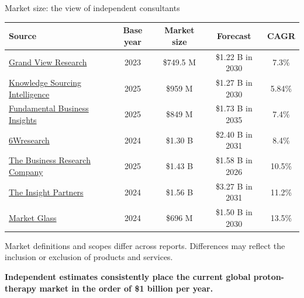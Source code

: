 \documentclass[aspectratio=169,11pt]{beamer}
\begin{document}
\begin{frame}{Market size: the view of independent consultants}

\centering

\renewcommand{\arraystretch}{1.18}
\setlength{\tabcolsep}{4pt}

\footnotesize

\begin{tabular}{@{}p{4.0cm} c c c c@{}}
\toprule
\textbf{Source} &
\textbf{Base year} &
\textbf{Market size} &
\textbf{Forecast} &
\textbf{CAGR} \\
\midrule

\href{https://www.grandviewresearch.com/industry-analysis/proton-therapy-systems-market}
{Grand View Research}
& 2023
& \$749.5 M
& \$1.22 B in 2030
& 7.3\% \\

\href{https://www.researchandmarkets.com/reports/6091787/proton-therapy-market-forecasts}
{Knowledge Sourcing Intelligence}
& 2025
& \$959 M
& \$1.27 B in 2030
& 5.84\% \\

\href{https://www.fundamentalbusinessinsights.com/industry-report/proton-therapy-systems-market-8081}
{Fundamental Business Insights}
& 2025
& \$849 M
& \$1.73 B in 2035
& 7.4\% \\

\href{https://www.6wresearch.com/industry-report/global-proton-therapy-systems-market}
{6Wresearch}
& 2024
& \$1.30 B
& \$2.40 B in 2031
& 8.4\% \\

\href{https://www.thebusinessresearchcompany.com/report/proton-therapy-systems-global-market-report}
{The Business Research Company}
& 2025
& \$1.43 B
& \$1.58 B in 2026
& 10.5\% \\

\href{https://www.researchandmarkets.com/reports/5954217/proton-therapy-systems-market}
{The Insight Partners}
& 2024
& \$1.56 B
& \$3.27 B in 2031
& 11.2\% \\

\href{https://www.researchandmarkets.com/reports/5309802/proton-therapy-global-strategic-business-report}
{Market Glass}
& 2024
& \$696 M
& \$1.50 B in 2030
& 13.5\% \\

\bottomrule
\end{tabular}

\vspace{0.35cm}

\tiny
Market definitions and scopes differ across reports. Differences may reflect the inclusion or exclusion
of products and services.

\vspace{0.3cm}

\normalsize
\centering
\textbf{
Independent estimates consistently place the current global
proton-therapy market in the order of \$1 billion per year.
}
\end{frame}
\end{document}
